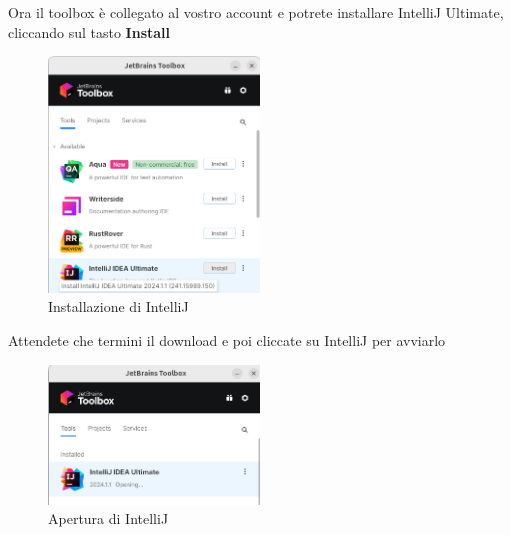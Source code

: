             Ora il toolbox è collegato al vostro account e potrete installare IntelliJ Ultimate, cliccando sul tasto \textbf{Install}
            \begin{figure}[H]
                \centering
                \graphicspath{{src/capitoli/04/img/}}
                \includegraphics[width=0.5\textwidth]{toolbox-install-intellij.png}
                \caption{Installazione di IntelliJ}
                \label{fig:Installazione di IntelliJ}
            \end{figure}

            Attendete che termini il download e poi cliccate su IntelliJ per avviarlo
            \begin{figure}[H]
                \centering
                \graphicspath{{src/capitoli/04/img/}}
                \includegraphics[width=0.5\textwidth]{toolbox-open-intellij.png}
                \caption{Apertura di IntelliJ}
                \label{fig:Apertura di IntelliJ}
            \end{figure}

